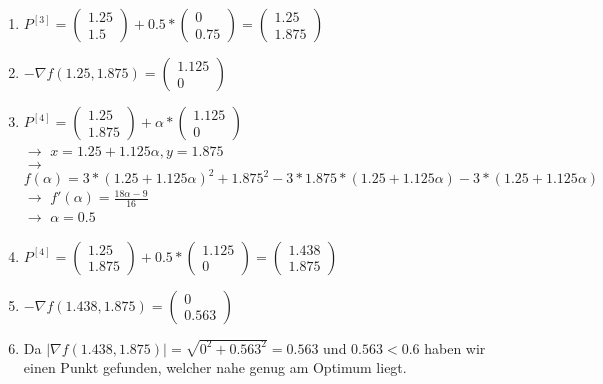 \documentclass[a4paper, 11pt]{article}
\begin{document}
\begin{enumerate}
	\item
	$P^{[3]}=\left( \begin{array}{c} 1.25 \\ 1.5 \end{array} \right) +0.5 * \left( \begin{array}{c} 0 \\ 0.75 \end{array} \right) = \left( \begin{array}{c} 1.25 \\ 1.875 \end{array} \right)$
	
	\item
	$-{\nabla}f(1.25,1.875) = \left( \begin{array}{c} 1.125 \\ 0 \end{array} \right)$
	
	\item
	$P^{[4]}=\left( \begin{array}{c} 1.25 \\ 1.875 \end{array} \right) + \alpha * \left( \begin{array}{c}  1.125 \\ 0 \end{array} \right)$\\ $\rightarrow$ $x=1.25+1.125\alpha, y=1.875$\\ $\rightarrow$ $f(\alpha)=3*(1.25+1.125\alpha)^2+1.875^2-3*1.875*(1.25+1.125\alpha)-3*(1.25+1.125\alpha)$\\ $\rightarrow$ $f'(\alpha)=\frac{18\alpha-9}{16}$\\ $\rightarrow$ $\alpha=0.5$
	
	\item
	$P^{[4]}=\left( \begin{array}{c} 1.25 \\ 1.875 \end{array} \right) +0.5 * \left( \begin{array}{c} 1.125 \\ 0 \end{array} \right) = \left( \begin{array}{c} 1.438 \\ 1.875 \end{array} \right)$
	
	\item
	$-{\nabla}f(1.438,1.875) = \left( \begin{array}{c} 0 \\ 0.563 \end{array} \right)$
	
	\item
	Da $|{\nabla}f(1.438,1.875)| = \sqrt{0^2+0.563^2} = 0.563$ und $0.563 < 0.6$ haben wir einen Punkt gefunden, welcher nahe genug am Optimum liegt. \\
      
\end{enumerate}
\end{document}
